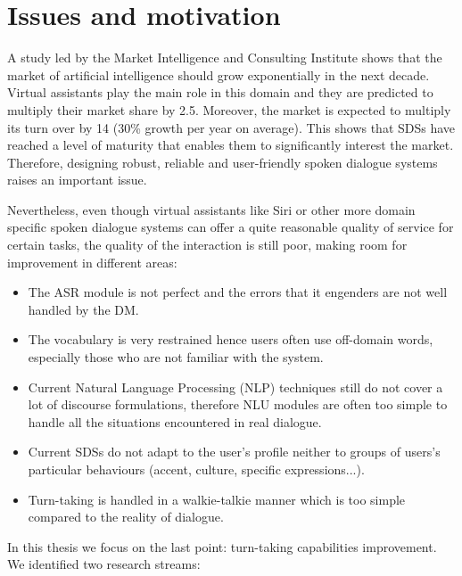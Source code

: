 \section{Issues and motivation}
    
    A study led by the Market Intelligence and Consulting Institute shows that the market of artificial intelligence should grow exponentially in the next decade. Virtual assistants play the main role in this domain and they are predicted to multiply their market share by 2.5. Moreover, the market is expected to multiply its turn over by 14 (30\% growth per year on average). This shows that SDSs have reached a level of maturity that enables them to significantly interest the market. Therefore, designing robust, reliable and user-friendly spoken dialogue systems raises an important issue.
    
    Nevertheless, even though virtual assistants like Siri or other more domain specific spoken dialogue systems can offer a quite reasonable quality of service for certain tasks, the quality of the interaction is still poor, making room for improvement in different areas:
    
    \begin{itemize}
    	\item The ASR module is not perfect and the errors that it engenders are not well handled by the DM.
        \item The vocabulary is very restrained hence users often use off-domain words, especially those who are not familiar with the system.
        \item Current Natural Language Processing (NLP) techniques still do not cover a lot of discourse formulations, therefore NLU modules are often too simple to handle all the situations encountered in real dialogue.
        \item Current SDSs do not adapt to the user's profile neither to groups of users's particular behaviours (accent, culture, specific expressions...).
        \item Turn-taking is handled in a walkie-talkie manner which is too simple compared to the reality of dialogue.
    \end{itemize}
    
    In this thesis we focus on the last point: turn-taking capabilities improvement. We identified two research streams:
    
